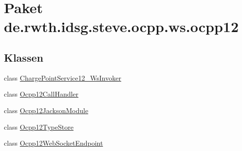 \hypertarget{namespacede_1_1rwth_1_1idsg_1_1steve_1_1ocpp_1_1ws_1_1ocpp12}{\section{Paket de.\-rwth.\-idsg.\-steve.\-ocpp.\-ws.\-ocpp12}
\label{namespacede_1_1rwth_1_1idsg_1_1steve_1_1ocpp_1_1ws_1_1ocpp12}
}
\subsection*{Klassen}
\begin{DoxyCompactItemize}
\item 
class \hyperlink{classde_1_1rwth_1_1idsg_1_1steve_1_1ocpp_1_1ws_1_1ocpp12_1_1_charge_point_service12___ws_invoker}{Charge\-Point\-Service12\-\_\-\-Ws\-Invoker}
\item 
class \hyperlink{classde_1_1rwth_1_1idsg_1_1steve_1_1ocpp_1_1ws_1_1ocpp12_1_1_ocpp12_call_handler}{Ocpp12\-Call\-Handler}
\item 
class \hyperlink{classde_1_1rwth_1_1idsg_1_1steve_1_1ocpp_1_1ws_1_1ocpp12_1_1_ocpp12_jackson_module}{Ocpp12\-Jackson\-Module}
\item 
class \hyperlink{classde_1_1rwth_1_1idsg_1_1steve_1_1ocpp_1_1ws_1_1ocpp12_1_1_ocpp12_type_store}{Ocpp12\-Type\-Store}
\item 
class \hyperlink{classde_1_1rwth_1_1idsg_1_1steve_1_1ocpp_1_1ws_1_1ocpp12_1_1_ocpp12_web_socket_endpoint}{Ocpp12\-Web\-Socket\-Endpoint}
\end{DoxyCompactItemize}
